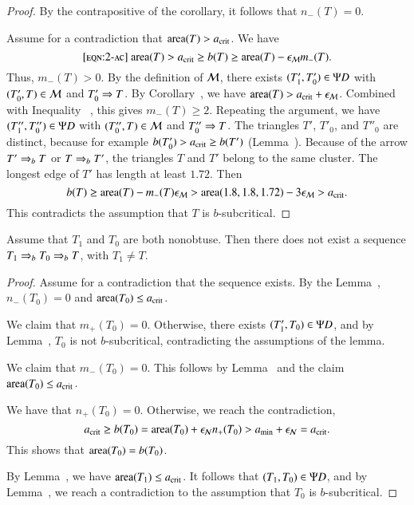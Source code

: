 \begin{proof}  
  By the contrapositive of the corollary, it follows that $n_-(T)=0$.

  Assume for a contradiction that ${\operatorname{area}}(T) > a_\text{crit}$.  We have
\begin{equation}\libel{eqn:2-ac}
\area(T) > \acrit \ge b(T) \ge \area(T) - \epsM m_-(T).
\end{equation}
Thus, $m_-(T) >0$.  By the definition of $\mathcal M$, there exists
$(T'_1,T'_0)\in\Psi D$ with $(T'_0,T)\in\mathcal M$ and $T'_0\Rightarrow T$.  By
Corollary~, we have ${\operatorname{area}}(T) >
a_\text{crit}+\epsilon_{\mathcal M}$. Combined with Inequality ~, this gives
$m_-(T)\ge 2$.  Repeating the argument, we have $(T''_1,T''_0)\in \Psi D$
with $(T''_0,T)\in \mathcal M$ and $T''_0\Rightarrow T$.  The triangles $T'$, $T'_0$,
and $T''_0$ are distinct, because for example $b(T'_0) > a_\text{crit} \ge
b(T')$ (Lemma~).  Because of the arrow $T'\Rightarrow_{b} T$ or $T\Rightarrow_{b}
T'$, the triangles $T$ and $T'$ belong to the same cluster.  The
longest edge of $T'$ has length at least $1.72$.  Then
\[
b(T) \ge {\operatorname{area}}(T) - m_-(T)\epsilon_{\mathcal M} > {\operatorname{area}}(1.8,1.8,1.72) - 3\epsilon_{\mathcal M} > a_\text{crit}.
\]
This  contradicts the assumption that $T$ is $b$-subcritical.
\end{proof}

\begin{lemma}  Assume that $T_1$ and $T_0$
  are both nonobtuse.  Then there does not exist a sequence $T_1\Rightarrow_{b}
  T_0 \Rightarrow_{b} T$, with $T_1\ne T$.
\end{lemma}

\begin{proof}  
  Assume for a contradiction that the sequence exists.  By the
  Lemma~, $n_-(T_0)=0$ and ${\operatorname{area}}(T_0)\le a_\text{crit}$.

  We claim that $m_+(T_0)=0$.  Otherwise, there exists
  $(T'_1,T_0)\in\Psi D$, and by Lemma~, $T_0$ is not
  $b$-subcritical, contradicting the assumptions of the lemma.

  We claim that $m_-(T_0)=0$.  This follows by
  Lemma~ and the claim ${\operatorname{area}}(T_0)\le a_\text{crit}$.

We have that $n_+(T_0)=0$.  Otherwise, we reach the contradiction,
\[
a_\text{crit} \ge b(T_0) ={\operatorname{area}}(T_0) + \epsilon_{\mathcal N} n_+(T_0) > a_\text{min} + \epsilon_{\mathcal N} = a_\text{crit}.
\]
This shows that ${\operatorname{area}}(T_0) = b(T_0)$.

By Lemma~, we have ${\operatorname{area}}(T_1)\le a_\text{crit}$.
It follows that $(T_1,T_0)\in\Psi D$, and by Lemma~,
we reach a contradiction to the assumption that $T_0$ is $b$-subcritical. 
\end{proof}
  
